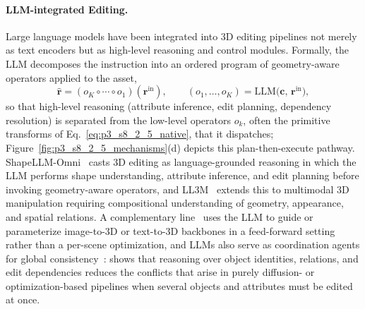 \paragraph{LLM-integrated Editing.}
Large language models have been integrated into 3D editing pipelines not merely as text encoders but as high-level reasoning and control modules.
Formally, the LLM decomposes the instruction into an ordered program of geometry-aware operators applied to the asset,
\begin{equation}
\hat{\mathbf{r}} = (o_K \circ \cdots \circ o_1)(\mathbf{r}^{\text{in}}), \qquad (o_1,\dots,o_K) = \mathrm{LLM}\big(\mathbf{c},\,\mathbf{r}^{\text{in}}\big),
\label{eq:p3_s8_2_5_llm}
\end{equation}
so that high-level reasoning (attribute inference, edit planning, dependency resolution) is separated from the low-level operators $o_k$, often the primitive transforms of Eq.~\eqref{eq:p3_s8_2_5_native}, that it dispatches; Figure~\ref{fig:p3_s8_2_5_mechanisms}(d) depicts this plan-then-execute pathway.
ShapeLLM-Omni~\cite{ye2025shapellmOmni} casts 3D editing as language-grounded reasoning in which the LLM performs shape understanding, attribute inference, and edit planning before invoking geometry-aware operators, and LL3M~\cite{lu2025ll3m} extends this to multimodal 3D manipulation requiring compositional understanding of geometry, appearance, and spatial relations.
A complementary line~\cite{ma2025feedforward3DEditing} uses the LLM to guide or parameterize image-to-3D or text-to-3D backbones in a feed-forward setting rather than a per-scene optimization, and LLMs also serve as coordination agents for global consistency~\cite{huang2024blenderalchemy,zhang2025scenelanguage}: \citet{xia2025towardsConsistent} shows that reasoning over object identities, relations, and edit dependencies reduces the conflicts that arise in purely diffusion- or optimization-based pipelines when several objects and attributes must be edited at once.

